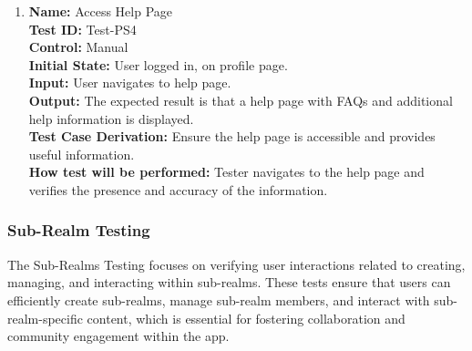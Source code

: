 \documentclass[12pt, titlepage]{article}
\begin{document}
\begin{enumerate}
    \item \textbf{Name:} {Access Help Page} \label{itm:Test-PS4}\\
    \textbf{Test ID:} Test-PS4\\
    \textbf{Control:} Manual \\
    \textbf{Initial State:} User logged in, on profile page. \\
    \textbf{Input:} User navigates to help page. \\
    \textbf{Output:} The expected result is that a help page with FAQs and additional help information is displayed. \\
    \textbf{Test Case Derivation:} Ensure the help page is accessible and provides useful information. \\
    \textbf{How test will be performed:} Tester navigates to the help page and verifies the presence and accuracy of the information.
\end{enumerate}

\subsubsection{Sub-Realm Testing}
\label{sec:sub-realms_testing}

The Sub-Realms Testing focuses on verifying user interactions related to creating, managing, and interacting within sub-realms. These tests ensure that users can efficiently create sub-realms, manage sub-realm members, and interact with sub-realm-specific content, which is essential for fostering collaboration and community engagement within the app.
\end{document}
